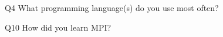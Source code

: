 \begin{description}%
\item{Q4} What programming language(s) do you use most often?%
\item{Q10} How did you learn MPI?%
\end{description}%
